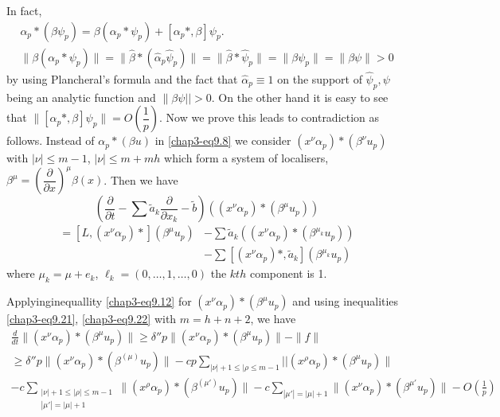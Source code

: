 In fact,
\begin{gather*}
\alpha_p *(\beta \psi_p ) =  \beta( \alpha_p * \psi_p) +  [ \alpha_p
  *, \beta ] \psi_p. \\ 
\| \beta(\alpha_p * \psi_p) \|  = \| \hat{\beta} * ( \hat{\alpha}_p
\hat{\psi}_p) \| = \| \hat{\beta} *\hat{\psi}_p \|  = \| \beta \psi_p
\| = \| \beta \psi \| >  0 
\end{gather*}
by using Plancheral's formula and the fact that $\hat{\alpha}_p \equiv
1$ on the support of $\hat{\psi}_p, \psi$ being an analytic function
and $\|\beta \psi ||> 0$. On the other hand it is easy to see that $\|
[\alpha_p *, \beta] \psi_p \| = O\left(\dfrac{1}{p}\right)$. Now we prove this
leads to contradiction as follows. Instead of $\alpha_p * (\beta u)$
in \eqref{chap3-eq9.8} we consider $( x^\nu \alpha_p) * (\beta^\nu
u_p)$ with $| \nu | \le m-1$, $| \nu | \le m + mh$ which form a system
of localisers, $\beta^\mu = \left( \dfrac{\partial}{\partial
  x}\right)^\mu \beta (x)$. Then we have   
$$  
\left( \frac{\partial}{\partial t} - \sum 
\tilde{a}_{k}\frac{\partial}{\partial x_k} - \tilde{b}\right) (( x^\nu
\alpha_p) * ( \beta^\mu u_p)) 
$$  
\begin{align*}
= [L, (x^\nu \alpha_p ) *] (\beta^{\mu} u_p) &- \sum \tilde{a}_k ((
x^\nu \alpha_p ) *  ( \beta^{\mu_k} u_p)) \\ 
&- \sum [(x^\nu \alpha_p ) *, \tilde{a}_k ] ( \beta^{\mu_k} u_p) 
\end{align*}
where $\mu_k = \mu +  e_k$, $\ell_k = (0, \ldots , 1 , \ldots , 0)$
the $kth$ component is 1. 

Applyinginequallity \eqref{chap3-eq9.12} for $(x^\nu \alpha_p) * (
\beta^\mu u_p)$ 
and using inequalities \eqref{chap3-eq9.21}, \eqref{chap3-eq9.22} with
$m = h  + n +2$, we have   
{\fontsize{10pt}{12pt}\selectfont
\begin{gather*}
\frac{d}{dt} \|  ( x^\nu \alpha_p) * ( \beta^\mu u_p) \| \ge \delta''
p \| (x^\nu \alpha_p) * ( \beta^\mu u_p) \| - \| f \| \\ 
\ge \delta'' p \| (x^\nu \alpha_p) * ( \beta^{(\mu)} u_p) \| - cp
\sum\limits_{|\nu|+1\le|\rho\le m-1} || (x^\rho \alpha_p) *  ( \beta^\mu
u_p) \| \\ 
- c \sum\limits_{\substack{|\nu|+1\le|\rho|\le m-1 \\ |\mu'|=|\mu|+1}}
\| (x^\rho \alpha_p)   * ( \beta^{(\mu ')} u_p )\| -c 
\sum\limits_{|\mu'|=|\mu|+1} \| (x^\nu \alpha_p) * ( \beta^{\mu'}u_p)\|
- O \left( \frac{1}{p}\right)   
\end{gather*}}

